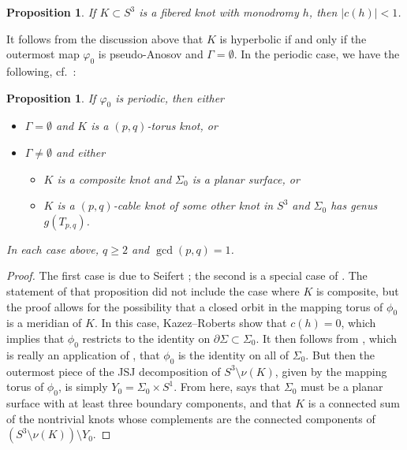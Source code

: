 \documentclass[11pt]{amsart}
\newtheorem {proposition}[theorem]{Proposition}
\numberwithin{equation}{section}
\numberwithin{theorem}{section}
\theoremstyle{definition}
\begin{document}
\begin{proposition}\label{prop:0-or-1/n}
If $K \subset S^3$ is a fibered knot with monodromy $h$, then  $|c(h)|<1$.
\end{proposition}

It follows from the discussion above that $K$ is hyperbolic if and only if  the outermost map $\varphi_0$ is pseudo-Anosov and $\Gamma = \emptyset$. In the periodic case, we have the following, cf.\ \cite[Theorem~2]{budney-jsj}:

\begin{proposition}\label{prop:periodic-cable}
If  $\varphi_0$ is periodic, then either
\begin{itemize}
\item $\Gamma = \emptyset$ and $K$ is a $(p,q)$-torus knot, or 
\item $\Gamma \neq \emptyset$ and either
\begin{itemize}
\item $K$ is a composite knot and $\Sigma_0$ is a planar surface, or
\item $K$ is a $(p,q)$-cable knot of some other knot in $S^3$ and $\Sigma_0$ has genus $g(T_{p,q})$.
\end{itemize}
\end{itemize}
In each case above, $q \geq 2$ and $\gcd(p,q) = 1$.
\end{proposition}

\begin{proof}
The first case is due to Seifert \cite{seifert}; the second is a special case of \cite[Proposition~4.2]{kazez-roberts}.  The statement of that proposition did not include the case where $K$ is composite, but  the proof allows for the possibility that a closed orbit in the mapping torus of $\phi_0$ is a meridian of $K$. In this case, Kazez--Roberts  show that $c(h) = 0$, which implies that $\phi_0$ restricts to the identity on $\partial \Sigma\subset \Sigma_0$. It then follows from \cite[Lemma~2.6]{bns}, which is  really an application of \cite[Lemma~1.1]{jiang-guo}, that $\phi_0$ is the identity on all of $\Sigma_0$.  But then the outermost piece of the JSJ decomposition of $S^3 \setminus \nu(K)$, given by the mapping torus of $\phi_0$, is simply $Y_0=\Sigma_0 \times S^1$.  From here, \cite{budney-jsj} says that $\Sigma_0$ must be a planar surface with at least three boundary components, and that  $K$ is a connected sum of the  nontrivial knots whose complements are the connected components of $(S^3\setminus \nu(K)) \setminus Y_0$.
\end{proof}
\end{document}

